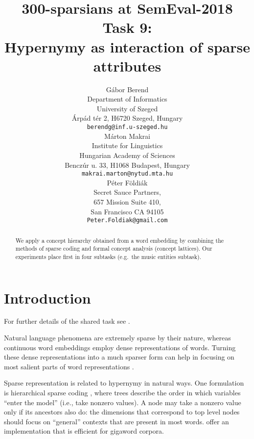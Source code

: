 \documentclass[11pt,a4paper]{article}
\title{300-sparsians at SemEval-2018 Task 9: \\
Hypernymy as interaction of sparse attributes}
\author{Gábor Berend \\
Department of Informatics \\ University of Szeged \\
Árpád tér 2, H6720 Szeged, Hungary \\
{\tt berendg@inf.u-szeged.hu} \\\And
  Márton Makrai  \\
  Institute for Linguistics \\
  Hungarian Academy of Sciences \\
  Benczúr u. 33, H1068 Budapest, Hungary \\
  {\tt makrai.marton@nytud.mta.hu} \\\AND
  Péter Földiák \\
  Secret Sauce Partners, \\
  657 Mission Suite 410, \\
  San Francisco CA 94105 \\
  {\tt Peter.Foldiak@gmail.com} \\}
\date{}
\begin{document}
\maketitle

\begin{abstract}
  We apply a concept hierarchy obtained from a word embedding by combining the
  methods of sparse coding and formal concept analysis (concept lattices).
  Our experiments place first in four subtasks (e.g.~the music entities
  subtask).
\end{abstract}




\section{Introduction}

For further details of the shared task see \cite{Camacho-Collados:2018}.

Natural language phenomena are extremely sparse by their nature, whereas
continuous word embeddings employ dense representations of words. Turning
these dense representations into a much sparser form can help in focusing on
most salient parts of word representations
\citep{Faruqui:2015,Berend:2017,Subramanian:2018}.

Sparse representation is related to hypernymy in natural ways.
One formulation is hierarchical sparse coding \citep{Zhao:2009}, where trees
describe the order in which variables “enter the model” (i.e., take nonzero
values). A node may take a nonzero value only if its ancestors also do: the
dimensions that correspond to top level nodes should focus on “general”
contexts that are present in most words. \citep{Yogatama:2015} offer an
implementation that is efficient for gigaword corpora.
\end{document}
